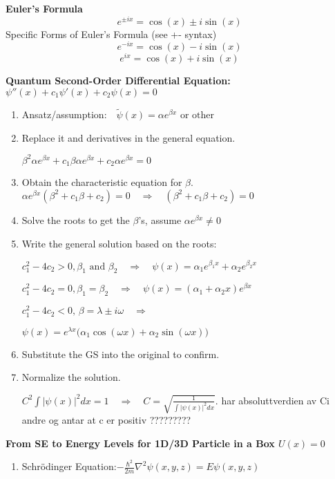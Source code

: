 \documentclass[a4paper,11pt]{article}
\renewcommand{\textbf}[1]{{\scriptsize	\bfseries #1}}
\begin{document}
\begin{footnotesize}
\begin{multicols}{2}
 \begin{minipage}{\linewidth}

\textbf{Euler's Formula} \\
\[
    e^{\pm ix} = \cos(x) \pm i \sin(x)
\]
Specific Forms of Euler's Formula (see +- syntax)
\[
    e^{-ix} = \cos(x) - i \sin(x)
\]
\[
    e^{ix} = \cos(x) + i \sin(x)
\]



\end{minipage}
\begin{minipage}{\linewidth}
\textbf{Quantum Second-Order Differential Equation:}
\(
\psi''(x) + c_1 \psi'(x) + c_2 \psi(x) = 0
\)
\begin{enumerate}
\item Ansatz/assumption:\(\quad \tilde{\psi}(x) = \alpha e^{\beta x} \text{ or other}\)
    \item Replace it and derivatives in the general equation.
    
   \(
\beta^2 \alpha e^{\beta x} + c_1 \beta \alpha e^{\beta x} + c_2 \alpha e^{\beta x} = 0
\)
    \item Obtain the characteristic equation for \(\beta\).
   \(
   \alpha e^{\beta x} (\beta^2 + c_1 \beta + c_2) = 0 \quad \Rightarrow \quad  (\beta^2 + c_1 \beta + c_2) = 0
   \)
    \item Solve the roots to get the \(\beta\)'s, assume $\alpha e^{\beta x} \neq 0$ 
    \item Write the general solution based on the roots:

\(c_1^2 - 4c_2 > 0, \beta_1 \text{ and } \beta_2 \quad \Rightarrow \quad \psi(x) = \alpha_1 e^{\beta_1 x} + \alpha_2 e^{\beta_2 x}\)

\(c_1^2 - 4c_2 = 0 , \beta_1 =\beta_2 \quad \Rightarrow \quad \psi(x) = (\alpha_1 + \alpha_2 x)e^{\beta x}\)

\(c_1^2 - 4c_2 < 0, \, \beta = \lambda \pm i\omega \quad \Rightarrow \)

\(\psi(x) = e^{\lambda x} \big(\alpha_1 \cos(\omega x) + \alpha_2 \sin(\omega x)\big)\)
\item Substitute the GS into the original to confirm.
\item Normalize the solution.

    \(
    C^2 \int |\psi(x)|^2 dx = 1 \quad \Rightarrow \quad C = \sqrt{\frac{1}{\int |\psi(x)|^2 dx}}.
    \)
har absoluttverdien av Ci andre og antar at c er positiv ?????????
\end{enumerate}


\textbf{From SE to Energy Levels for 1D/3D Particle in a Box $U(x) = 0$}
\begin{enumerate}
\item Schrödinger Equation:\(-\frac{\hbar^2}{2m} \nabla^2 \psi(x, y, z) = E \psi(x, y, z)\)


\end{enumerate}
\end{minipage}
\end{multicols}
\end{footnotesize}
\end{document}
